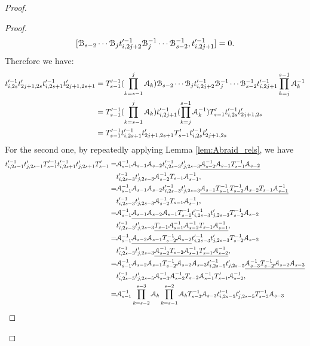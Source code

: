 \documentclass{amsart}
\begin{document}
\begin{proof}
\begin{proof}
\[
[\mathcal{B}_{s-2}\cdots\mathcal{B}_jt'^{-1}_{i,2j+2}\mathcal{B}^{-1}_j\cdots\mathcal{B}^{-1}_{s-2},t'^{-1}_{i,2j+1}]=0.
\]
Therefore we have:
\[
\begin{aligned}
t'^{-1}_{i,2s}t'_{2j+1,2s}t'^{-1}_{i,2s+1}t'_{2j+1,2s+1}&=T'^{-1}_{s-1}(\prod_{k=s-1}^{j}\mathcal{A}_{k})\mathcal{B}_{s-2}\cdots\mathcal{B}_jt'^{-1}_{i,2j+2}\mathcal{B}^{-1}_j\cdots\mathcal{B}^{-1}_{s-2}t'^{-1}_{i,2j+1}\prod_{k=j}^{s-1}\mathcal{A}^{-1}_k\\
&=T'^{-1}_{s-1}(\prod_{k=s-1}^{j}\mathcal{A}_{k})t'^{-1}_{i,2j+1}(\prod_{k=j}^{s-1}\mathcal{A}^{-1}_k) T'_{s-1} t'^{-1}_{i,2s}t'_{2j+1,2s}\\
&=T'^{-1}_{s-1}t'^{-1}_{i,2s+1}t'_{2j+1,2s+1}T'_{s-1}t'^{-1}_{i,2s}t'_{2j+1,2s}    
\end{aligned}
\]
For the second one, by repeatedly applying Lemma \ref{lem:Abraid_rels}, we have 
\begin{align*}
 t'^{-1}_{i,2s-1}t'_{j,2s-1}T'^{-1}_{s-1}t'^{-1}_{i,2s+1}t'_{j,2s+1}T'_{s-1}=&\AA^{-1}_{s-1}\AA_{s-1}\AA_{s-2}t'^{-1}_{i,2s-3}t'_{j,2s-3}\underline{\AA^{-1}_{s-2}\AA_{s-1}T^{-1}_{s-1}\AA_{s-2}}\\
 &t'^{-1}_{i,2s-3}t'_{j,2s-3}\AA^{-1}_{s-2} T_{s-1}\AA^{-1}_{s-1},\\
 =&\AA^{-1}_{s-1}\AA_{s-1}\AA_{s-2}t'^{-1}_{i,2s-3}t'_{j,2s-3}\underline{\AA_{s-1}T^{-1}_{s-1}T^{-1}_{s-2}\AA_{s-2}T_{s-1}\AA^{-1}_{s-1}}\\
 &t'^{-1}_{i,2s-3}t'_{j,2s-3}\AA^{-1}_{s-2} T_{s-1}\AA^{-1}_{s-1},\\
 =&\AA^{-1}_{s-1}\underline{\AA_{s-1}\AA_{s-2}\AA_{s-1}T^{-1}_{s-1}}t'^{-1}_{i,2s-3}t'_{j,2s-3}T^{-1}_{s-2}\AA_{s-2}\\
 &t'^{-1}_{i,2s-3}t'_{j,2s-3}\underline{T_{s-1}\AA^{-1}_{s-1}\AA^{-1}_{s-2} T_{s-1}\AA^{-1}_{s-1}},\\
 =&\AA^{-1}_{s-1}\underline{\AA_{s-2}\AA_{s-1}T^{-1}_{s-2}\AA_{s-2}}t'^{-1}_{i,2s-3}t'_{j,2s-3}T^{-1}_{s-2}\AA_{s-2}\\
 &t'^{-1}_{i,2s-3}t'_{j,2s-3}\underline{\AA^{-1}_{s-2}T_{s-2}\AA^{-1}_{s-1} T'_{s-1}\AA^{-1}_{s-2}},\\
 =&\AA^{-1}_{s-1}\AA_{s-2}\AA_{s-1}T^{-1}_{s-2}\AA_{s-2}\AA_{s-3}t'^{-1}_{i,2s-5}t'_{j,2s-5}\underline{\AA^{-1}_{s-3}T^{-1}_{s-2}\AA_{s-2}\AA_{s-3}}\\
 &t'^{-1}_{i,2s-5}t'_{j,2s-5}\AA^{-1}_{s-3}\AA^{-1}_{s-2}T_{s-2}\AA^{-1}_{s-1} T'_{s-1}\AA^{-1}_{s-2},\\
 =&\AA^{-1}_{s-1}\prod^{s-3}_{k=s-2}\AA_{k}\prod^{s-2}_{k=s-1}\AA_{k}T^{-1}_{s-3}\AA_{s-3}t'^{-1}_{i,2s-5}t'_{j,2s-5}T^{-1}_{s-3}\AA_{s-3}\\

\end{align*}
\end{proof}
\end{proof}
\end{document}
